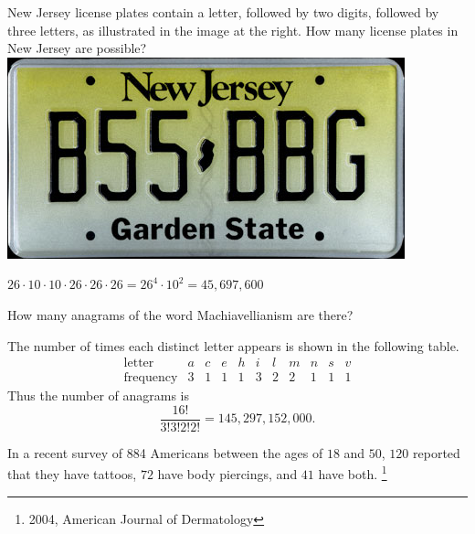 \documentclass[answers,addpoints,12pt]{exam}
\begin{document}
\begin{questions}
\begin{solution}
\end{solution}

\begin{multicols}{2}
\question
New Jersey license plates contain a letter,
followed by two digits, followed by three letters,
as illustrated in the image at the right.
How many license plates in New Jersey are possible?\\
\columnbreak
\includegraphics[scale=.3]{NewJersy}
\end{multicols}
\begin{solution}
$26\cdot 10\cdot 10\cdot 26\cdot 26\cdot 26=26^4\cdot 10^2
=45,697,600$
\end{solution}

\question How many anagrams of the word
{\textsf{Machiavellianism}} are there?
\begin{solution}
The number of times each distinct letter appears is
shown in the following table.
\[\begin{array}{r|cccccccccc}
\text{letter}&a&c&e&h&i&l&m&n&s&v\\\hline
\text{frequency}&3&1&1&1&3&2&2&1&1&1
\end{array}\]
Thus the number of anagrams is
\[\frac{16!}{3!3!2!2!}=145,297,152,000.\]
\end{solution}

\question In a recent survey of 884 Americans between the ages
of $18$ and $50$, $120$ reported that they have tattoos,
$72$ have body piercings, and $41$ have both.
\footnote{2004, American Journal of Dermatology}
\begin{parts}

\end{parts}
\end{questions}
\end{document}
